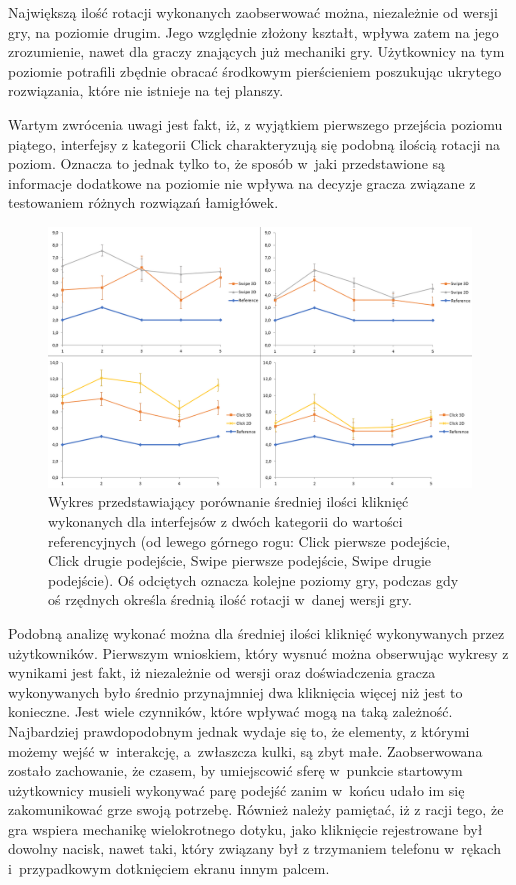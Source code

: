 \documentclass[a4paper,12pt,numbers=noenddot]{report}
\begin{document}
Największą ilość rotacji wykonanych zaobserwować można, niezależnie od wersji gry, na poziomie drugim. Jego względnie złożony kształt, wpływa zatem na jego zrozumienie, nawet dla graczy znających już mechaniki gry. Użytkownicy na tym poziomie potrafili zbędnie obracać środkowym pierścieniem poszukując ukrytego rozwiązania, które nie istnieje na tej planszy. 

Wartym zwrócenia uwagi jest fakt, iż, z wyjątkiem pierwszego przejścia poziomu piątego, interfejsy z kategorii Click charakteryzują się podobną ilością rotacji na poziom. Oznacza to jednak tylko to, że sposób w~jaki przedstawione są informacje dodatkowe na poziomie nie wpływa na decyzje gracza związane z testowaniem różnych rozwiązań łamigłówek. \\

\begin{figure}[h!]
	\centering
  	\includegraphics[width=\linewidth]{diag/ref_clicks.png}
	\caption{Wykres przedstawiający porównanie średniej ilości kliknięć wykonanych dla interfejsów z dwóch kategorii do wartości referencyjnych (od lewego górnego rogu: Click pierwsze podejście, Click drugie podejście, Swipe pierwsze podejście, Swipe drugie podejście). Oś odciętych oznacza kolejne poziomy gry, podczas gdy oś rzędnych określa średnią ilość rotacji w~danej wersji gry.}
	\label{fig:ref:clicks}
\end{figure}

Podobną analizę wykonać można dla średniej ilości kliknięć wykonywanych przez użytkowników. Pierwszym wnioskiem, który wysnuć można obserwując wykresy z wynikami jest fakt, iż niezależnie od wersji oraz doświadczenia gracza wykonywanych było średnio przynajmniej dwa kliknięcia więcej niż jest to konieczne. Jest wiele czynników, które wpływać mogą na taką zależność. Najbardziej prawdopodobnym jednak wydaje się to, że elementy,  z którymi możemy wejść w~interakcję, a~zwłaszcza kulki, są zbyt małe. Zaobserwowana zostało zachowanie, że czasem, by umiejscowić sferę w~punkcie startowym użytkownicy musieli wykonywać parę podejść zanim w~końcu udało im się zakomunikować grze swoją potrzebę. Również należy pamiętać, iż z racji tego, że gra wspiera mechanikę wielokrotnego dotyku, jako kliknięcie rejestrowane był dowolny nacisk, nawet taki, który związany był z trzymaniem telefonu w~rękach i~przypadkowym dotknięciem ekranu innym palcem. 
\end{document}
